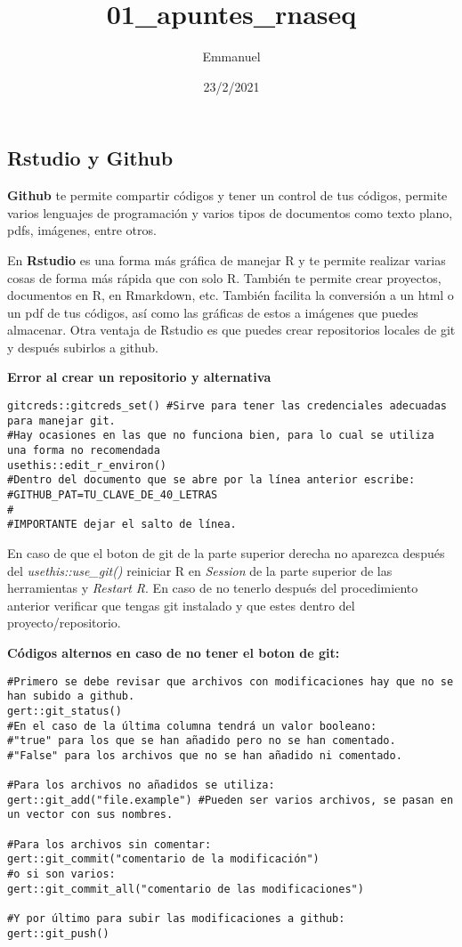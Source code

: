 \documentclass[
]{article}
\title{01\_apuntes\_rnaseq}
\author{Emmanuel}
\date{23/2/2021}
\begin{document}
\maketitle

\hypertarget{rstudio-y-github}{%
\subsection{Rstudio y Github}\label{rstudio-y-github}}

\textbf{Github} te permite compartir códigos y tener un control de tus
códigos, permite varios lenguajes de programación y varios tipos de
documentos como texto plano, pdfs, imágenes, entre otros.

En \textbf{Rstudio} es una forma más gráfica de manejar R y te permite
realizar varias cosas de forma más rápida que con solo R. También te
permite crear proyectos, documentos en R, en Rmarkdown, etc. También
facilita la conversión a un html o un pdf de tus códigos, así como las
gráficas de estos a imágenes que puedes almacenar. Otra ventaja de
Rstudio es que puedes crear repositorios locales de git y después
subirlos a github.

\textbf{Error al crear un repositorio y alternativa}

\begin{verbatim}
gitcreds::gitcreds_set() #Sirve para tener las credenciales adecuadas para manejar git.
#Hay ocasiones en las que no funciona bien, para lo cual se utiliza una forma no recomendada
usethis::edit_r_environ()
#Dentro del documento que se abre por la línea anterior escribe: 
#GITHUB_PAT=TU_CLAVE_DE_40_LETRAS
#
#IMPORTANTE dejar el salto de línea.
\end{verbatim}

En caso de que el boton de git de la parte superior derecha no aparezca
después del \emph{usethis::use\_git()} reiniciar R en \emph{Session} de
la parte superior de las herramientas y \emph{Restart R}. En caso de no
tenerlo después del procedimiento anterior verificar que tengas git
instalado y que estes dentro del proyecto/repositorio.

\textbf{Códigos alternos en caso de no tener el boton de git:}

\begin{verbatim}
#Primero se debe revisar que archivos con modificaciones hay que no se han subido a github.
gert::git_status()
#En el caso de la última columna tendrá un valor booleano: 
#"true" para los que se han añadido pero no se han comentado.
#"False" para los archivos que no se han añadido ni comentado.

#Para los archivos no añadidos se utiliza:
gert::git_add("file.example") #Pueden ser varios archivos, se pasan en un vector con sus nombres.

#Para los archivos sin comentar:
gert::git_commit("comentario de la modificación")
#o si son varios:
gert::git_commit_all("comentario de las modificaciones")

#Y por último para subir las modificaciones a github:
gert::git_push()
\end{verbatim}
\end{document}
